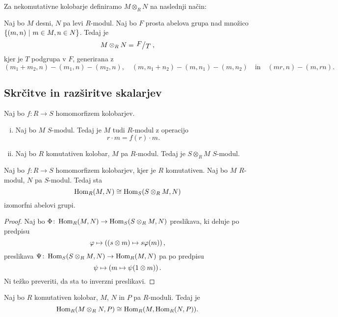 \begin{opomba}
Za nekomutativne kolobarje definiramo $M \otimes_R N$ na naslednji
način:

Naj bo $M$ desni, $N$ pa levi $R$-modul. Naj bo $F$ prosta abelova
grupa nad množico $\left\{(m,n)~\middle\vert~m \in M, n \in N\right\}$. Tedaj je
\[
M \otimes_R N = \kvoc{F}{T},
\]
kjer je $T$ podgrupa v $F$, generirana z
\[
(m_1 + m_2, n) - (m_1, n) - (m_2, n),
\quad
(m, n_1 + n_2) - (m, n_1) - (m, n_2)
\quad \text{in} \quad
(mr, n) - (m, rn).
\]
\end{opomba}

\newpage

\subsection{Skrčitve in razširitve skalarjev}

\begin{trditev}
Naj bo $f \colon R \to S$ homomorfizem kolobarjev.

\begin{enumerate}[i)]
\item Naj bo $M$ $S$-modul. Tedaj je $M$ tudi $R$-modul z
operacijo
\[
r \cdot m = f(r) \cdot m.
\]
\item Naj bo $R$ komutativen kolobar, $M$ pa $R$-modul. Tedaj je
$S \otimes_R M$ $S$-modul.
\end{enumerate}
\end{trditev}

\obvs

\begin{trditev}
Naj bo $f \colon R \to S$ homomorfizem kolobarjev, kjer je $R$
komutativen. Naj bo $M$ $R$-modul, $N$ pa $S$-modul. Tedaj sta
\[
\operatorname{Hom}_R(M,N) \cong \operatorname{Hom}_S(S \otimes_R M, N)
\]
izomorfni abelovi grupi.
\end{trditev}

\begin{proof}
Naj bo $\Phi \colon \operatorname{Hom}_R(M,N) \to \operatorname{Hom}_S(S \otimes_R M, N)$
preslikava, ki deluje po predpisu
\[
\varphi \mapsto \left((s \otimes m) \mapsto s \varphi(m)\right),
\]
preslikava $\Psi \colon \operatorname{Hom}_S(S \otimes_R M, N) \to \operatorname{Hom}_R(M,N)$
pa po predpisu
\[
\psi \mapsto \left(m \mapsto \psi(1 \otimes m)\right).
\]
Ni težko preveriti, da sta to inverzni preslikavi.
\end{proof}

\begin{izrek}
Naj bo $R$ komutativen kolobar, $M$, $N$ in $P$ pa $R$-moduli.
Tedaj je
\[
\operatorname{Hom}_R(M \otimes_R N, P) \cong \operatorname{Hom}_R(M, \operatorname{Hom}_R(N,P)).
\]
\end{izrek}

